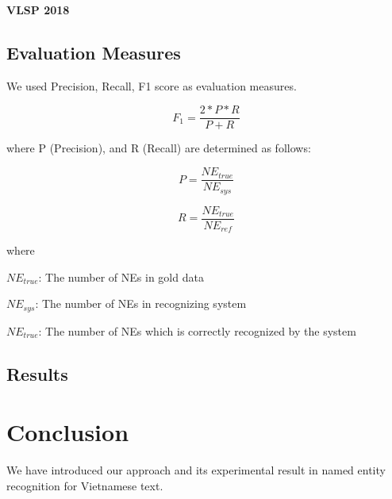\documentclass[11pt,a4paper]{article}
\begin{document}
\noindent \textbf{VLSP 2018}


\subsection{Evaluation Measures}

We used Precision, Recall, F1 score as evaluation measures.

$$F_1 = \frac{2*P*R}{P + R}$$

where P (Precision), and R (Recall) are determined as follows:

$$P = \frac{{NE}_{true}}{NE_{sys}}$$

$$R = \frac{{NE}_{true}}{NE_{ref}}$$

where

$NE_{true}$: The number of NEs in gold data

$NE_{sys}$: The number of NEs in recognizing system

$NE_{true}$: The number of NEs which is correctly recognized by the system

\subsection{Results}


\section{Conclusion}

We have introduced our approach and its experimental result in named entity recognition for Vietnamese text.




\end{document}

